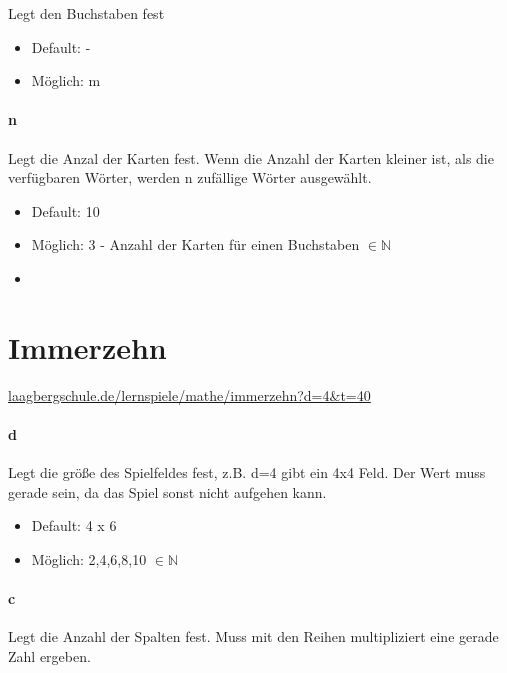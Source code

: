 \documentclass[
  paper=a4,
  ,captions=tableheading
]{scrartcl}
\providecommand{\tightlist}{%
  \setlength{\itemsep}{0pt}\setlength{\parskip}{0pt}}
\begin{document}
Legt den Buchstaben fest

\begin{itemize}
\tightlist
\item
  Default: -
\item
  Möglich: m \bigskip
\end{itemize}

\hypertarget{n}{%
\paragraph{n}\label{n}}

Legt die Anzal der Karten fest. Wenn die Anzahl der Karten kleiner ist,
als die verfügbaren Wörter, werden n zufällige Wörter ausgewählt.

\begin{itemize}
\tightlist
\item
  Default: 10
\item
  Möglich: 3 - Anzahl der Karten für einen Buchstaben \(\in \mathbb{N}\)
\item
\end{itemize}

\hypertarget{immerzehn}{%
\section{Immerzehn}\label{immerzehn}}

\href{https://www.laagbergschule.de/lernspiele/mathe/immerzehn?d=4\&t=40}{laagbergschule.de/lernspiele/mathe/immerzehn?d=4\&t=40}

\hypertarget{d}{%
\paragraph{d}\label{d}}

Legt die größe des Spielfeldes fest, z.B. d=4 gibt ein 4x4 Feld. Der
Wert muss gerade sein, da das Spiel sonst nicht aufgehen kann.

\begin{itemize}
\tightlist
\item
  Default: 4 x 6
\item
  Möglich: 2,4,6,8,10 \(\in \mathbb{N}\)
\end{itemize}

\hypertarget{c-2}{%
\paragraph{c}\label{c-2}}

Legt die Anzahl der Spalten fest. Muss mit den Reihen multipliziert eine
gerade Zahl ergeben.
\end{document}
